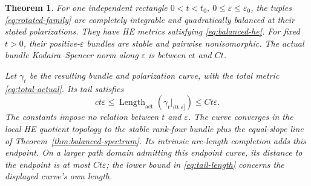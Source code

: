 \documentclass[11pt]{amsart}
\newtheorem{theorem}{Theorem}[section]
\theoremstyle{definition}
\theoremstyle{remark}
\begin{document}
\begin{theorem}\label{thm:moving-curve}
For one independent rectangle $0<t<t_0$, $0\le\varepsilon\le\varepsilon_0$,
the tuples \eqref{eq:rotated-family} are completely integrable and
quadratically balanced at their stated polarizations. They have HE
metrics satisfying \eqref{eq:balanced-he}. For fixed $t>0$, their
positive-$\varepsilon$ bundles are stable and pairwise nonisomorphic.
The actual bundle Kodaira--Spencer norm along $\varepsilon$ is between
$ct$ and $Ct$.

Let $\gamma_t$ be the resulting bundle and polarization curve, with
the total metric \eqref{eq:total-actual}. Its tail satisfies
\begin{equation}\label{eq:tail-length}
 ct\varepsilon\le
 \operatorname{Length}_{\mathrm{act}}
       (\gamma_t|_{(0,\varepsilon]})\le Ct\varepsilon.
\end{equation}
The constants impose no relation between $t$ and $\varepsilon$.
The curve converges in the local HE quotient topology to the stable
rank-four bundle plus the equal-slope line of
Theorem~\ref{thm:balanced-spectrum}. Its intrinsic arc-length completion
adds this endpoint. On a larger path domain admitting this endpoint
curve, its distance to the endpoint is at most $Ct\varepsilon$;
the lower bound in \eqref{eq:tail-length} concerns the displayed
curve's own length.
\end{theorem}
\end{document}
